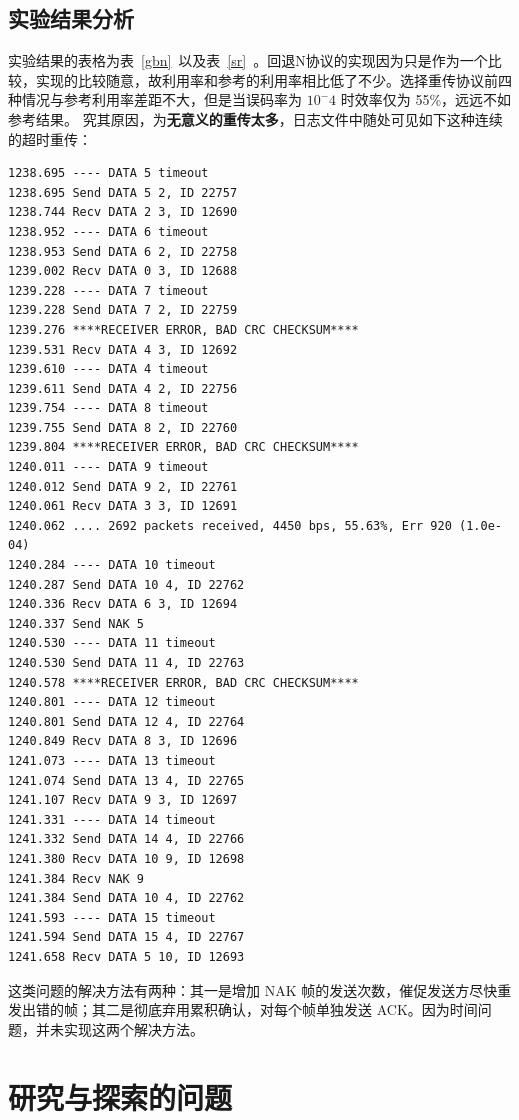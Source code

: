 \documentclass[14pt]{article} %
\begin{document}
\subsection{实验结果分析}
实验结果的表格为表~\ref{gbn}~以及表~\ref{sr}~。回退N协议的实现因为只是作为一个比较，实现的比较随意，故利用率和参考的利用率相比低了不少。选择重传协议前四种情况与参考利用率差距不大，但是当误码率为 $10^-4$ 时效率仅为 55\%，远远不如参考结果。
究其原因，为\textbf{无意义的重传太多}，日志文件中随处可见如下这种连续的超时重传：
\begin{lstlisting}
1238.695 ---- DATA 5 timeout
1238.695 Send DATA 5 2, ID 22757
1238.744 Recv DATA 2 3, ID 12690
1238.952 ---- DATA 6 timeout
1238.953 Send DATA 6 2, ID 22758
1239.002 Recv DATA 0 3, ID 12688
1239.228 ---- DATA 7 timeout
1239.228 Send DATA 7 2, ID 22759
1239.276 ****RECEIVER ERROR, BAD CRC CHECKSUM****
1239.531 Recv DATA 4 3, ID 12692
1239.610 ---- DATA 4 timeout
1239.611 Send DATA 4 2, ID 22756
1239.754 ---- DATA 8 timeout
1239.755 Send DATA 8 2, ID 22760
1239.804 ****RECEIVER ERROR, BAD CRC CHECKSUM****
1240.011 ---- DATA 9 timeout
1240.012 Send DATA 9 2, ID 22761
1240.061 Recv DATA 3 3, ID 12691
1240.062 .... 2692 packets received, 4450 bps, 55.63%, Err 920 (1.0e-04)
1240.284 ---- DATA 10 timeout
1240.287 Send DATA 10 4, ID 22762
1240.336 Recv DATA 6 3, ID 12694
1240.337 Send NAK 5
1240.530 ---- DATA 11 timeout
1240.530 Send DATA 11 4, ID 22763
1240.578 ****RECEIVER ERROR, BAD CRC CHECKSUM****
1240.801 ---- DATA 12 timeout
1240.801 Send DATA 12 4, ID 22764
1240.849 Recv DATA 8 3, ID 12696
1241.073 ---- DATA 13 timeout
1241.074 Send DATA 13 4, ID 22765
1241.107 Recv DATA 9 3, ID 12697
1241.331 ---- DATA 14 timeout
1241.332 Send DATA 14 4, ID 22766
1241.380 Recv DATA 10 9, ID 12698
1241.384 Recv NAK 9
1241.384 Send DATA 10 4, ID 22762
1241.593 ---- DATA 15 timeout
1241.594 Send DATA 15 4, ID 22767
1241.658 Recv DATA 5 10, ID 12693
\end{lstlisting}

这类问题的解决方法有两种：其一是增加 NAK 帧的发送次数，催促发送方尽快重发出错的帧；其二是彻底弃用累积确认，对每个帧单独发送 ACK。因为时间问题，并未实现这两个解决方法。

\section{研究与探索的问题}
\end{document}

